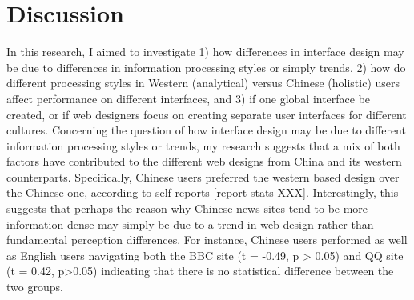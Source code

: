 
\chapter{Discussion} %

\label{Chapter9} %




In this research, I aimed to investigate 1) how differences in interface design may be due to differences in information processing styles or simply trends, 2) how do different processing styles in Western (analytical) versus Chinese (holistic) users affect performance on different interfaces, and 3) if one global interface be created, or if web designers focus on creating separate user interfaces for different cultures. Concerning the question of how interface design may be due to different information processing styles or trends, my research suggests that a mix of both factors have contributed to the different web designs from China and its western counterparts. Specifically, Chinese users preferred the western based design over the Chinese one, according to self-reports [report stats XXX]. Interestingly, this suggests that perhaps the reason why Chinese news sites tend to be more information dense may simply be due to a trend in web design rather than fundamental perception differences. For instance, Chinese users performed as well as English users navigating both the BBC site (t = -0.49, p > 0.05) and QQ site (t = 0.42, p>0.05) indicating that there is no statistical difference between the two groups. 
\\\\
